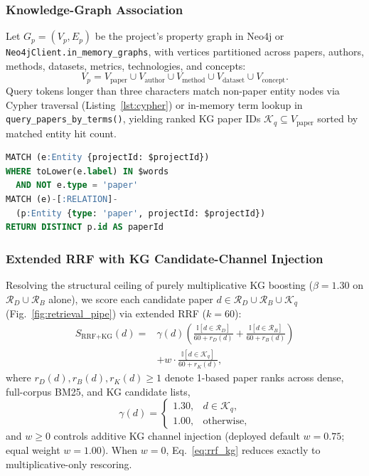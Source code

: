 \documentclass[conference]{IEEEtran}
\begin{document}
\subsubsection{Knowledge-Graph Association}
Let $G_p = (V_p, E_p)$ be the project's property graph in Neo4j or \texttt{Neo4jClient.in\_memory\_graphs}, with vertices partitioned across papers, authors, methods, datasets, metrics, technologies, and concepts:
\begin{equation}
V_p = V_{\text{paper}} \cup V_{\text{author}} \cup V_{\text{method}} \cup V_{\text{dataset}} \cup V_{\text{concept}}.
\end{equation}
Query tokens longer than three characters match non-paper entity nodes via Cypher traversal (Listing~\ref{lst:cypher}) or in-memory term lookup in \texttt{query\_papers\_by\_terms()}, yielding ranked KG paper IDs $\mathcal{K}_q \subseteq V_{\text{paper}}$ sorted by matched entity hit count.

\begin{lstlisting}[language=SQL,caption={Executed Neo4j Cypher traversal in graph\_service.py.},label={lst:cypher}]
MATCH (e:Entity {projectId: $projectId})
WHERE toLower(e.label) IN $words
  AND NOT e.type = 'paper'
MATCH (e)-[:RELATION]-
  (p:Entity {type: 'paper', projectId: $projectId})
RETURN DISTINCT p.id AS paperId
\end{lstlisting}

\subsubsection{Extended RRF with KG Candidate-Channel Injection}
Resolving the structural ceiling of purely multiplicative KG boosting ($\beta{=}1.30$ on $\mathcal{R}_D \cup \mathcal{R}_B$ alone), we score each candidate paper $d \in \mathcal{R}_D \cup \mathcal{R}_B \cup \mathcal{K}_q$ (Fig.~\ref{fig:retrieval_pipe}) via extended RRF ($k{=}60$):
\begin{equation}
\label{eq:rrf_kg}
\begin{aligned}
S_{\text{RRF+KG}}(d) ={}& \gamma(d)\!\left(\frac{\mathbb{I}[d \in \mathcal{R}_D]}{60 + r_D(d)} + \frac{\mathbb{I}[d \in \mathcal{R}_B]}{60 + r_B(d)}\right) \\
& + w \cdot \frac{\mathbb{I}[d \in \mathcal{K}_q]}{60 + r_K(d)},
\end{aligned}
\end{equation}
where $r_D(d), r_B(d), r_K(d) \ge 1$ denote 1-based paper ranks across dense, full-corpus BM25, and KG candidate lists,
\begin{equation}
\gamma(d) =
\begin{cases}
1.30, & d \in \mathcal{K}_q,\\
1.00, & \text{otherwise},
\end{cases}
\end{equation}
and $w \ge 0$ controls additive KG channel injection (deployed default $w{=}0.75$; equal weight $w{=}1.00$). When $w{=}0$, Eq.~\eqref{eq:rrf_kg} reduces exactly to multiplicative-only rescoring.
\end{document}
